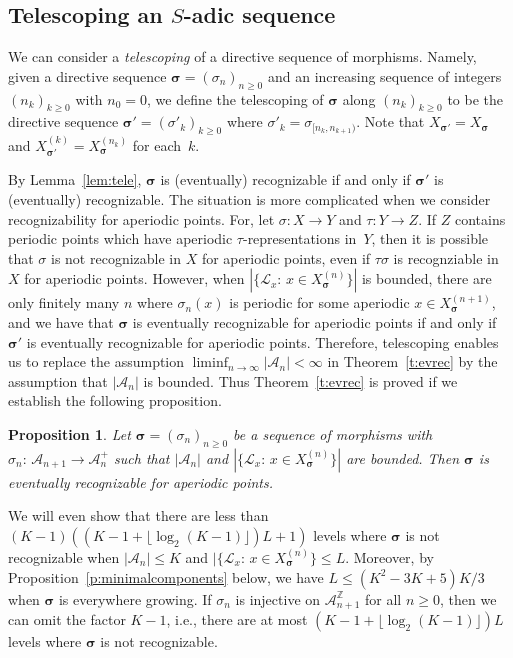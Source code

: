 \documentclass{amsart}
\newtheorem{proposition}[lemma]{Proposition}
\theoremstyle{definition}
\theoremstyle{remark}
\numberwithin{equation}{section}
\begin{document}
\subsection{Telescoping an $S$-adic sequence}\label{sec:telesc}
We can consider a \emph{telescoping} of a directive sequence of morphisms. 
Namely, given a directive sequence $ {\boldsymbol{\sigma}}= (\sigma_n)_{n\geq 0}$ and an increasing sequence of integers $(n_k)_{k \geq 0}$ with $n_0=0$, we define the telescoping of $\boldsymbol{\sigma}$ along  $(n_k)_{k \geq 0}$ to be the directive sequence  $\boldsymbol{\sigma}'= (\sigma'_k)_{k\geq 0}$ where $\sigma'_k = \sigma_{[n_k,n_{k+1})}$. 
Note that $X_{\boldsymbol{\sigma}'} = X_{\boldsymbol{\sigma}}$ and $X_{\boldsymbol{\sigma}'}^{(k)} = X_{\boldsymbol{\sigma}}^{(n_k)}$ for each~$k$.  

By Lemma~\ref{lem:tele}, $\boldsymbol{\sigma}$ is (eventually) recognizable if and only if $\boldsymbol{\sigma}'$ is (eventually) recognizable.  The situation is more complicated when we consider recognizability for aperiodic points. For, let $\sigma:X\rightarrow Y$ and $\tau:Y\rightarrow Z$. If $Z$ contains periodic points which have aperiodic $\tau$-representations in~$Y$, then it is possible that $\sigma$ is not recognizable in $X$ for aperiodic points, even if $\tau \sigma$ is recognziable in~$X$ for aperiodic points. However,
when $|\{\mathcal{L}_x:\, x \in X_{\boldsymbol{\sigma}}^{(n)}\}|$ is bounded, there are only finitely many $n$  where $\sigma_n(x)$ is periodic for some aperiodic $x \in X_{\boldsymbol{\sigma}}^{(n+1)}$, and 
we have that $\boldsymbol{\sigma}$ is eventually recognizable for aperiodic points if and only if $\boldsymbol{\sigma}'$ is eventually recognizable for aperiodic points.
Therefore, telescoping enables us to replace the assumption $\liminf_{n\to\infty} |\mathcal{A}_n| < \infty$ in Theorem~\ref{t:evrec} by the assumption that $|\mathcal{A}_n|$ is bounded. 
Thus Theorem~\ref{t:evrec} is proved if we establish the following proposition.


\begin{proposition} \label{p:evrec2}
Let $\boldsymbol{\sigma} = (\sigma_n)_{n\ge0}$ be a sequence of morphisms with $\sigma_n:\, \mathcal{A}_{n+1}\to \mathcal{A}_n^+$ such that $|\mathcal{A}_n|$ and $|\{\mathcal{L}_x:\, x \in X_{\boldsymbol{\sigma}}^{(n)}\}|$ are bounded. 
Then $\boldsymbol{\sigma}$ is eventually recognizable for aperiodic points. 
\end{proposition}

We will even show that there are less than $(K-1) ((K-1+\lfloor \log_2(K-1) \rfloor)  L+1)$ levels where $\boldsymbol{\sigma}$ is not recognizable when $|\mathcal A_n|\leq K$ and $   |\{\mathcal{L}_x:\, x \in X_{\boldsymbol{\sigma}}^{(n)}\}\leq L$. 
Moreover, by Proposition~\ref{p:minimalcomponents} below, we have $L \le (K^2-3K+5)K/3$ when $\boldsymbol{\sigma}$ is everywhere growing.
If $\sigma_n$ is injective on $\mathcal{A}_{n+1}^\mathbb{Z}$ for all $n\ge0$, then we can omit the factor $K-1$, i.e., there are at most $(K-1+\lfloor \log_2(K-1) \rfloor)  L$ levels where $\boldsymbol{\sigma}$ is not recognizable. 
\end{document}
